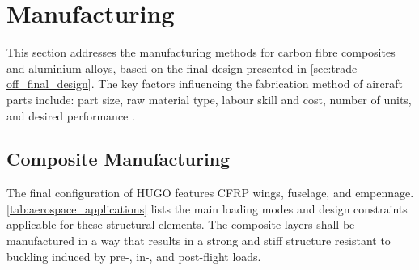 \section{Manufacturing}
\label{sec:Manufacturing}
This section addresses the manufacturing methods for carbon fibre composites and aluminium alloys, based on the final design presented in \autoref{sec:trade-off_final_design}. The key factors influencing the fabrication method of aircraft parts include: part size, raw material type, labour skill and cost, number of units, and desired performance \cite{JABBAR2021177}.

\subsection{Composite Manufacturing}
\label{subsec:composites}
The final configuration of HUGO features CFRP wings, fuselage, and empennage. 
\autoref{tab:aerospace_applications} lists the main loading modes and design constraints applicable for these structural elements. The composite layers shall be manufactured in a way that results in a strong and stiff structure resistant to buckling induced by pre-, in-, and post-flight loads.

